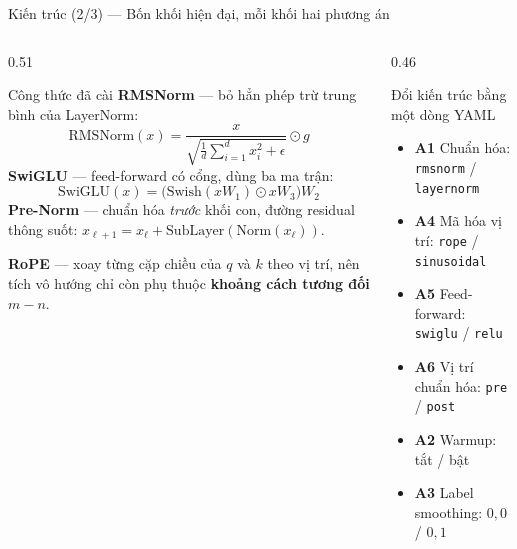 \documentclass[aspectratio=169, 10pt]{beamer}
\begin{document}
\begin{frame}[shrink=10]{Kiến trúc (2/3) — Bốn khối hiện đại, mỗi khối hai phương án}
  \begin{columns}[T]
    \begin{column}{0.51\textwidth}
      \begin{block}{Công thức đã cài}
        \footnotesize
        \setlength{\abovedisplayskip}{3pt}\setlength{\belowdisplayskip}{3pt}
        \setlength{\abovedisplayshortskip}{3pt}\setlength{\belowdisplayshortskip}{3pt}
        \textbf{RMSNorm} — bỏ hẳn phép trừ trung bình của LayerNorm:
        \[
          \mathrm{RMSNorm}(x) =
          \frac{x}{\sqrt{\frac{1}{d}\sum_{i=1}^{d} x_i^{2} + \epsilon}} \odot g
        \]
        \textbf{SwiGLU} — feed-forward có cổng, dùng ba ma trận:
        \[
          \mathrm{SwiGLU}(x) = \big(\mathrm{Swish}(xW_1) \odot xW_3\big) W_2
        \]
        \textbf{Pre-Norm} — chuẩn hóa \textit{trước} khối con, đường residual
        thông suốt: $x_{\ell+1} = x_{\ell} + \mathrm{SubLayer}(\mathrm{Norm}(x_{\ell}))$.
        \par\vspace{0.3em}
        \textbf{RoPE} — xoay từng cặp chiều của $q$ và $k$ theo vị trí, nên tích vô
        hướng chỉ còn phụ thuộc \textbf{khoảng cách tương đối} $m - n$.
      \end{block}
    \end{column}
    \begin{column}{0.46\textwidth}
      \begin{block}{Đổi kiến trúc bằng một dòng YAML}
        \footnotesize
        \begin{itemize}
          \setlength{\itemsep}{0.1em}
          \item \textbf{A1} Chuẩn hóa: \texttt{rmsnorm} / \texttt{layernorm}
          \item \textbf{A4} Mã hóa vị trí: \texttt{rope} / \texttt{sinusoidal}
          \item \textbf{A5} Feed-forward: \texttt{swiglu} / \texttt{relu}
          \item \textbf{A6} Vị trí chuẩn hóa: \texttt{pre} / \texttt{post}
          \item \textbf{A2} Warmup: tắt / bật
          \item \textbf{A3} Label smoothing: $0{,}0$ / $0{,}1$

\end{itemize}
\end{block}
\end{column}
\end{columns}
\end{frame}
\end{document}

